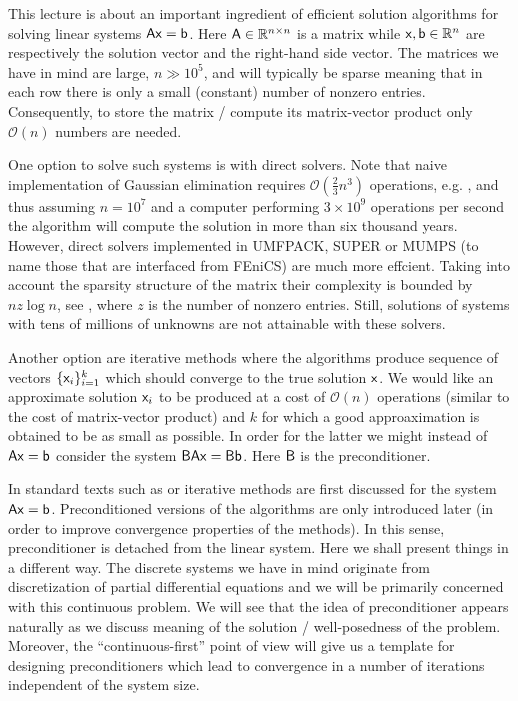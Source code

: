 This lecture is about an important ingredient of efficient solution algorithms for
solving linear systems $\mathsf{A}\mathsf{x}=\mathsf{b}$. Here $\mathsf{A}\in\mathbb{R}^{n\times n}$
is a matrix while $\mathsf{x}, \mathsf{b}\in\mathbb{R}^n$ are respectively the solution vector
and the right-hand side vector. The matrices we have in mind are large, $n \gg
10^5$, and will typically be sparse meaning that in each row there is only a small
(constant) number of nonzero entries. Consequently, to store the matrix / compute its 
matrix-vector product only $\mathcal{O}(n)$ numbers are needed.

One option to solve such systems is with direct solvers. Note that naive
implementation of Gaussian elimination requires $\mathcal{O}(\tfrac{2}{3}n^3)$
operations, e.g. , and thus assuming $n=10^7$ and a computer performing $3\times 10^9$
operations per second the algorithm will compute the solution in more than six
thousand years. However, direct solvers implemented in UMFPACK,
SUPER or MUMPS (to name those that are interfaced from FEniCS)
are much more effcient. Taking into account the sparsity structure of the matrix
their complexity is bounded by $n z \log{n}$, see , where $z$ is the number 
of nonzero entries. Still, solutions of systems with tens of millions of unknowns are not
attainable with these solvers.

Another option are iterative methods where the algorithms produce sequence of
vectors $\{\mathsf{x}_i\}_{i=1}^{k}$ which should converge to the true solution $\mathsf{x}$. We
would like an approximate solution $\mathsf{x}_i$ to be produced at a cost of
$\mathcal{O}(n)$ operations (similar to the cost of matrix-vector product) and $k$
for which a good approaximation is obtained to be as small as possible. In order
for the latter we might instead of $\mathsf{A}\mathsf{x}=\mathsf{b}$ consider the system
$\mathsf{B}\mathsf{A}\mathsf{x}=\mathsf{B}\mathsf{b}$. Here $\mathsf{B}$ is the preconditioner.

In standard texts such as  or  iterative methods are
first discussed for the system $\mathsf{A}\mathsf{x}=\mathsf{b}$. Preconditioned versions of
the algorithms are only introduced later (in order to improve convergence
properties of the methods). In this sense, preconditioner is detached from the
linear system. Here we shall present things in a different way. The discrete systems 
we have in mind originate from discretization of partial differential equations and 
we will be primarily concerned with this continuous problem. We will see that the idea 
of preconditioner appears naturally as we discuss meaning of the solution /
well-posedness of the problem. Moreover, the ``continuous-first'' point of view will 
give us a template for designing preconditioners which lead to convergence in a number 
of iterations independent of the system size.
